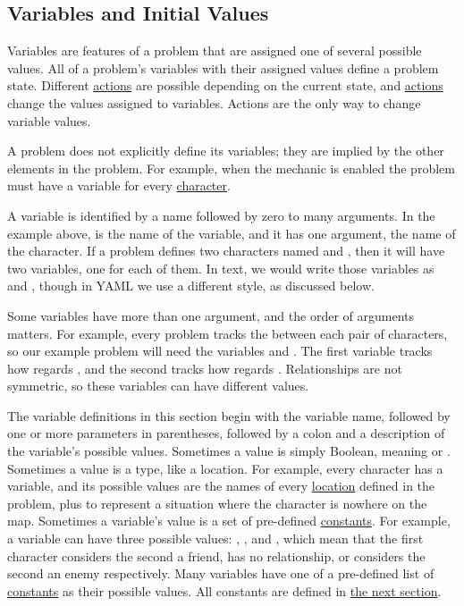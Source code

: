 \documentclass{nilreport}
\begin{document}
\newpage

\subsection{Variables and Initial Values} \label{sec:variables}

Variables are features of a problem that are assigned one of several possible values. All of a problem's variables with their assigned values define a problem state. Different \hyperref[sec:actions]{actions} are possible depending on the current state, and \hyperref[sec:actions]{actions} change the values assigned to variables. Actions are the only way to change variable values.

A problem does not explicitly define its variables; they are implied by the other elements in the problem. For example, when the  mechanic is enabled the problem must have a  variable for every \hyperref[sec:characters]{character}.

A variable is identified by a name followed by zero to many arguments. In the example above,  is the name of the variable, and it has one argument, the name of the character. If a problem defines two characters named  and , then it will have two  variables, one for each of them. In text, we would write those variables as  and , though in YAML we use a different style, as discussed below.

Some variables have more than one argument, and the order of arguments matters. For example, every problem tracks the  between each pair of characters, so our example problem will need the variables  and . The first variable tracks how  regards , and the second tracks how  regards . Relationships are not symmetric, so these variables can have different values.

The variable definitions in this section begin with the variable name, followed by one or more parameters in parentheses, followed by a colon and a description of the variable's possible values. Sometimes a value is simply Boolean, meaning  or . Sometimes a value is a type, like a location. For example, every character has a  variable, and its possible values are the names of every \hyperref[sec:locations]{location} defined in the problem, plus \None to represent a situation where the character is nowhere on the map. Sometimes a variable's value is a set of pre-defined \hyperref[sec:constants]{constants}. For example, a  variable can have three possible values: , \None, and , which mean that the first character considers the second a friend, has no relationship, or considers the second an enemy respectively. Many variables have one of a pre-defined list of \hyperref[sec:constants]{constants} as their possible values. All constants are defined in \hyperref[sec:constants]{the next section}.
\end{document}
